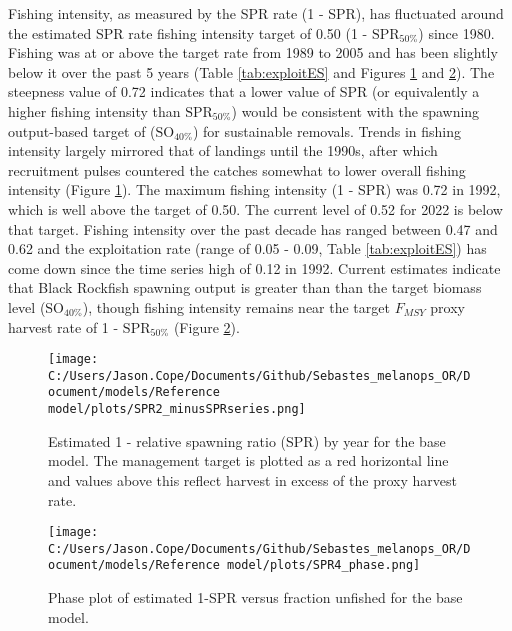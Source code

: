 \documentclass[11pt,
  english,
  letterpaper,
]{article}
\begin{document}
Fishing intensity, as measured by the SPR rate (1 - SPR), has fluctuated around the estimated SPR rate fishing intensity target of 0.50 (1 - \(\text{SPR}_{50\%}\)) since 1980. Fishing was at or above the target rate from 1989 to 2005 and has been slightly below it over the past 5 years (Table \ref{tab:exploitES} and Figures \ref{fig:es-1-spr} and \ref{fig:es-phase}). The steepness value of 0.72 indicates that a lower value of SPR (or equivalently a higher fishing intensity than \(\text{SPR}_{50\%}\)) would be consistent with the spawning output-based target of (\(\text{SO}_{40\%}\)) for sustainable removals. Trends in fishing intensity largely mirrored that of landings until the 1990s, after which recruitment pulses countered the catches somewhat to lower overall fishing intensity (Figure \ref{fig:es-1-spr}). The maximum fishing intensity (1 - SPR) was 0.72 in 1992, which is well above the target of 0.50. The current level of 0.52 for 2022 is below that target. Fishing intensity over the past decade has ranged between 0.47 and 0.62 and the exploitation rate (range of 0.05 - 0.09, Table \ref{tab:exploitES}) has come down since the time series high of 0.12 in 1992. Current estimates indicate that Black Rockfish spawning output is greater than than the target biomass level (\(\text{SO}_{40\%}\)), though fishing intensity remains near the target \(F_{MSY}\) proxy harvest rate of 1 - \(\text{SPR}_{50\%}\) (Figure \ref{fig:es-phase}).



\begin{figure}
\centering
\texttt{[image: C:/Users/Jason.Cope/Documents/Github/Sebastes\_melanops\_OR/Document/models/Reference model/plots/SPR2\_minusSPRseries.png]}
\caption{Estimated 1 - relative spawning ratio (SPR) by year for the base model. The management target is plotted as a red horizontal line and values above this reflect harvest in excess of the proxy harvest rate.\label{fig:es-1-spr}}
\end{figure}

\begin{figure}
\centering
\texttt{[image: C:/Users/Jason.Cope/Documents/Github/Sebastes\_melanops\_OR/Document/models/Reference model/plots/SPR4\_phase.png]}
\caption{Phase plot of estimated 1-SPR versus fraction unfished for the base model.\label{fig:es-phase}}
\end{figure}

\clearpage
\end{document}
